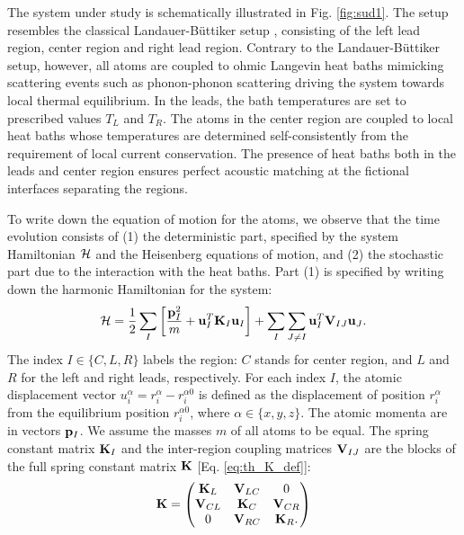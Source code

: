 The system under study is schematically illustrated in Fig. \ref{fig:sud1}. The setup resembles the classical Landauer-B\"uttiker setup \cite{datta}, consisting of the left lead region, center region and right lead region. Contrary to the Landauer-B\"uttiker setup, however, all atoms are coupled to ohmic Langevin heat baths mimicking scattering events such as phonon-phonon scattering driving the system towards local thermal equilibrium. In the leads, the bath temperatures are set to prescribed values $T_L$ and $T_R$. The atoms in the center region are coupled to local heat baths whose temperatures are determined self-consistently from the requirement of local current conservation. The presence of heat baths both in the leads and center region ensures perfect acoustic matching at the fictional interfaces separating the regions. %

To write down the equation of motion for the atoms, we observe that the time evolution consists of (1) the deterministic part, specified by the system Hamiltonian $\mathcal{H}$ and the Heisenberg equations of motion, and (2) the stochastic part due to the interaction with the heat baths.  Part (1) is specified by writing down the harmonic Hamiltonian for the system:
\begin{equation}
 \mathcal{H} = \frac{1}{2}  \sum_I \left[ \frac{\mathbf{p}_I^2}{m}+\mathbf{u}_I^T\mathbf{K}_I \mathbf{u}_I \right] + \sum_I \sum_{J\neq I} \mathbf{u}_I^T \mathbf{V}_{IJ} \mathbf{u}_J.
\end{equation}
The index $I\in\{C,L,R\}$ labels the region: $C$ stands for center region, and $L$ and $R$ for the left and right leads, respectively. For each index $I$, the atomic displacement vector $u_i^{\alpha}=r_i^{\alpha}-r_i^{\alpha 0}$ is defined as the displacement of position $r_i^{\alpha}$ from the equilibrium position $r^{\alpha 0}_i$, where $\alpha\in\{x,y,z\}$. The atomic momenta are in vectors $\mathbf{p}_I$. We assume the masses $m$ of all atoms to be equal. The spring constant matrix $\mathbf{K}_I$ and the inter-region coupling matrices $\mathbf{V}_{IJ}$ are the blocks of the full spring constant matrix $\mathbf{K}$ [Eq. \eqref{eq:th_K_def}]:
\begin{equation}
 \mathbf{K} = \left(\begin{matrix}
                 \mathbf{K}_L & \mathbf{V}_{LC} & 0 \\
		\mathbf{V}_{CL} & \mathbf{K}_C & \mathbf{V}_{CR} \\
		0 & \mathbf{V}_{RC} & \mathbf{K}_R.
                \end{matrix}
 \right)
\end{equation}
 
